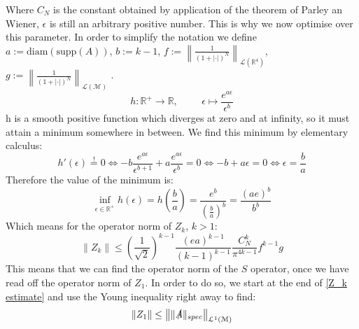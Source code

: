 \documentclass[b5paper,draft,openbib,12pt]{memoir}
\newcommand{\equaltext}[1]{\ensuremath{\stackrel{\text{#1}}{=}}}
\begin{document}
Where \(C_N\) is the constant obtained by application of the theorem of Parley an Wiener, \(\epsilon\) is still an arbitrary positive number. This is why we now optimise over this parameter. In order to simplify the notation we define \(a:=\text{diam}(\text{supp}(A))\), \(b:= k-1\), \(f:=\left\|\frac{1}{(1+|\cdot |)^N} \right\|_{\mathcal{L}(\mathbb{R}^4)}\), \(g:=\left\|\frac{1}{(1+|\cdot |)^N} \right\|_{\mathcal{L}(\mathcal{M})} \) .
\begin{equation}
h: \mathbb{R}^+\rightarrow \mathbb{R},\hspace{1cm}\epsilon\mapsto\frac{e^{a \epsilon}}{\epsilon^b}
\end{equation}
h is a smooth positive function which diverges at zero and at infinity, so it must attain a minimum somewhere in between. We find this minimum by elementary calculus:
\begin{equation}
h'(\epsilon)\equaltext{!}0 \iff -b \frac{e^{a \epsilon}}{\epsilon^{b+1}}+ a \frac{e^{a \epsilon}}{\epsilon^b}=0 \iff -b +a \epsilon=0 \iff \epsilon= \frac{b}{a}
\end{equation}
Therefore the value of the minimum is:
\begin{equation}
\inf_{\epsilon\in\mathbb{R}^+} h(\epsilon)= h(\frac{b}{a})=\frac{e^b}{\left(\frac{b}{a}\right)^b}=\frac{(a e)^b}{b^b}
\end{equation}
Which means for the operator norm of \(Z_k\),  \(k>1\):
\begin{equation}
\|Z_k\|\le \left(\frac{1}{\sqrt{2} }\right)^{k-1} \frac{\left(e a\right)^{k-1}}{(k-1)^{k-1}} \frac{ C_N^k}{\pi^{4k-1}}  f^{k-1}  g
\end{equation}
This means that we can find the operator norm of the \(S\) operator, once we have read off the operator norm of \(Z_1\). In order to do so, we start at the end of  \eqref{Z_k estimate} and use the Young inequality right away to find:
\begin{equation}
\|Z_1\|\le \left\| \|\slashed{A}\|_{spec} \right\|_{\mathcal{L}^1(\mathcal{M})}
\end{equation}
\end{document}

